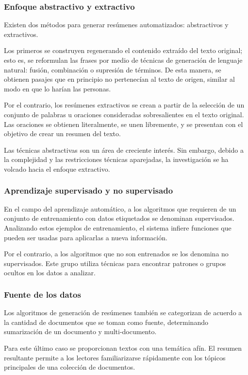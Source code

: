 \documentclass[a4paper]{article}
\begin{document}
\subsubsection{Enfoque abstractivo y extractivo}

Existen dos métodos para generar resúmenes automatizados: abstractivos y extractivos.

Los primeros se construyen regenerando el contenido extraído del texto original; esto es, se reformulan las frases por medio de técnicas de generación de lenguaje natural: fusión, combinación o supresión de términos. De esta manera, se obtienen pasajes que en principio no pertenecían al texto de origen, similar al modo en que lo harían las personas. 

Por el contrario, los resúmenes extractivos se crean a partir de la selección de un conjunto de palabras u oraciones consideradas sobresalientes en el texto original. Las oraciones se obtienen literalmente, se unen libremente, y se presentan con el objetivo de crear un resumen del texto.

Las técnicas abstractivas son un área de creciente interés. Sin embargo, debido a la complejidad y las restricciones técnicas aparejadas, la investigación se ha volcado hacia el enfoque extractivo.


\subsubsection{Aprendizaje supervisado y no supervisado}
En el campo del aprendizaje automático, a los algoritmos que requieren de un conjunto de entrenamiento con datos etiquetados se denominan supervisados. Analizando estos ejemplos de entrenamiento, el sistema infiere funciones que pueden ser usadas para aplicarlas a nueva información.

Por el contrario, a los algoritmos que no son entrenados se los denomina no supervisados. Este grupo utiliza técnicas para encontrar patrones o grupos ocultos en los datos a analizar.


\subsubsection{Fuente de los datos}
Los algoritmos de generación de resúmenes también se categorizan de acuerdo a la cantidad de documentos que se toman como fuente, determinando sumarización de un documento y multi-documento.

Para este último caso se proporcionan textos con una temática afín. El resumen resultante permite a los lectores familiarizarse rápidamente con los tópicos principales de una colección de documentos.
\end{document}
